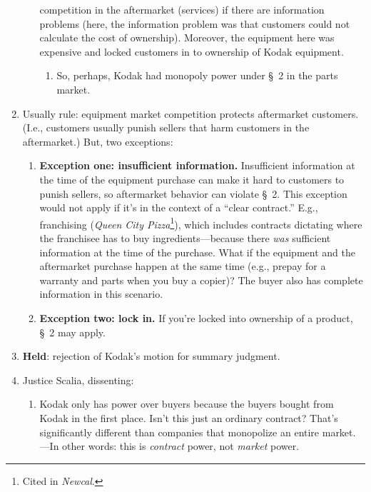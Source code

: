 \begin{enumerate}
\begin{enumerate}
        competition in the aftermarket (services) if there are information 
        problems (here, the information problem was that customers could not 
        calculate the cost of ownership). Moreover, the equipment here was 
        expensive and locked customers in to ownership of Kodak equipment.
        \begin{enumerate}
            \item So, perhaps, Kodak had monopoly power under \S\ 2 in 
            the parts market.
        \end{enumerate}
    \end{enumerate}
    \item Usually rule: equipment market competition protects aftermarket 
    customers. (I.e., customers usually punish sellers that harm customers in 
    the aftermarket.) But, two exceptions: 
    \begin{enumerate}
        \item \textbf{Exception one: insufficient information.} Insufficient 
        information at the time of the equipment purchase can make it hard to 
        customers to punish sellers, so aftermarket behavior can violate \S\ 
        2. This exception would not apply if it's in the context of a ``clear 
        contract.'' E.g., franchising (\emph{Queen City Pizza}\footnote{Cited 
        in \emph{Newcal}.}), which includes contracts dictating where the 
        franchisee has to buy ingredients---because there \emph{was} 
        sufficient information at the time of the purchase. What if the 
        equipment and the aftermarket purchase happen at the same time (e.g., 
        prepay for a warranty and parts when you buy a copier)? The buyer also 
        has complete information in this scenario.
        \item \textbf{Exception two: lock in.} If you're locked into ownership 
        of a product, \S\ 2 may apply.
    \end{enumerate}
    \item \textbf{Held}: rejection of Kodak's motion for summary judgment.
    \item Justice Scalia, dissenting:
    \begin{enumerate}
        \item Kodak only has power over buyers because the buyers bought from 
        Kodak in the first place. Isn't this just an ordinary contract? That's 
        significantly different than companies that monopolize an entire 
        market.---In other words: this is \emph{contract} power, not 
        \emph{market} power.
    \end{enumerate}
\end{enumerate}

